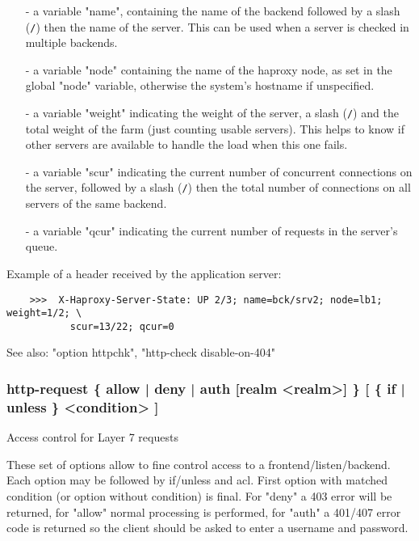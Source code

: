   \begin{itemize}
  \item[-] a variable "name", containing the name of the backend followed by a slash
      (\verb|/|) then the name of the server. This can be used when a server is
      checked in multiple backends.

  \item[-] a variable "node" containing the name of the haproxy node, as set in the
      global "node" variable, otherwise the system's hostname if unspecified.

  \item[-] a variable "weight" indicating the weight of the server, a slash (\verb|/|)
      and the total weight of the farm (just counting usable servers). This
      helps to know if other servers are available to handle the load when this
      one fails.

  \item[-] a variable "scur" indicating the current number of concurrent connections
      on the server, followed by a slash (\verb|/|) then the total number of
      connections on all servers of the same backend.

  \item[-] a variable "qcur" indicating the current number of requests in the
      server's queue.
  \end{itemize}

  Example of a header received by the application server:
  \begin{verbatim}
    >>>  X-Haproxy-Server-State: UP 2/3; name=bck/srv2; node=lb1; weight=1/2; \
           scur=13/22; qcur=0
  \end{verbatim}

  See also: "option httpchk", "http-check disable-on-404"

\subsubsection[http-request]{http-request \{ allow | deny | auth [realm <realm>] \} [ \{ if | unless \} <condition> ]}
\index{http-request}
  Access control for Layer 7 requests


  These set of options allow to fine control access to a
  frontend/listen/backend. Each option may be followed by if/unless and acl.
  First option with matched condition (or option without condition) is final.
  For "deny" a 403 error will be returned, for "allow" normal processing is
  performed, for "auth" a 401/407 error code is returned so the client
  should be asked to enter a username and password.

